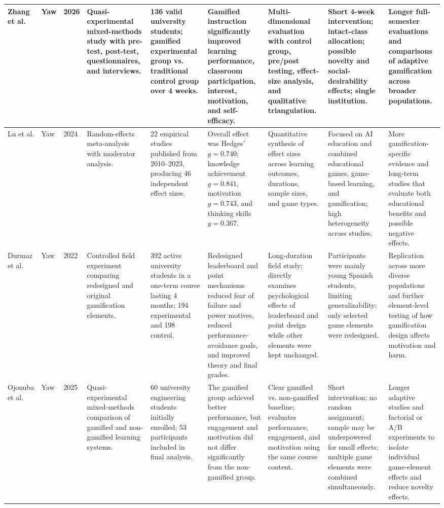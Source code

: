 \documentclass[12pt,a4paper]{article}
\begin{document}
\begin{longtable}{|
L{1.5cm}|
L{1.1cm}|
C{0.7cm}|
L{1.7cm}|
L{1.7cm}|
L{2.2cm}|
L{1.7cm}|
L{1.7cm}|
L{1.9cm}|}
Zhang et al. &
Yaw &
2026 &
Quasi-experimental mixed-methods study with pre-test, post-test, questionnaires, and interviews. &
136 valid university students; gamified experimental group vs. traditional control group over 4 weeks. &
Gamified instruction significantly improved learning performance, classroom participation, interest, motivation, and self-efficacy. &
Multi-dimensional evaluation with control group, pre/post testing, effect-size analysis, and qualitative triangulation. &
Short 4-week intervention; intact-class allocation; possible novelty and social-desirability effects; single institution. &
Longer full-semester evaluations and comparisons of adaptive gamification across broader populations.
\tabularnewline
\hline


Lu et al. &
Yaw &
2024 &
Random-effects meta-analysis with moderator analysis. &
22 empirical studies published from 2010--2023, producing 46 independent effect sizes. &
Overall effect was Hedges' $g=0.740$; knowledge achievement $g=0.841$, motivation $g=0.743$, and thinking skills $g=0.367$. &
Quantitative synthesis of effect sizes across learning outcomes, durations, sample sizes, and game types. &
Focused on AI education and combined educational games, game-based learning, and gamification; high heterogeneity across studies. &
More gamification-specific evidence and long-term studies that evaluate both educational benefits and possible negative effects.
\tabularnewline
\hline


Durmaz et al. &
Yaw &
2022 &
Controlled field experiment comparing redesigned and original gamification elements. &
392 active university students in a one-term course lasting 4 months; 194 experimental and 198 control. &
Redesigned leaderboard and point mechanisms reduced fear of failure and power motives, reduced performance-avoidance goals, and improved theory and final grades. &
Long-duration field study; directly examines psychological effects of leaderboard and point design while other elements were kept unchanged. &
Participants were mainly young Spanish students, limiting generalizability; only selected game elements were redesigned. &
Replication across more diverse populations and further element-level testing of how gamification design affects motivation and harm.
\tabularnewline
\hline


Ojonuba et al. &
Yaw &
2025 &
Quasi-experimental mixed-methods comparison of gamified and non-gamified learning systems. &
60 university engineering students initially enrolled; 53 participants included in final analysis. &
The gamified group achieved better performance, but engagement and motivation did not differ significantly from the non-gamified group. &
Clear gamified vs. non-gamified baseline; evaluates performance, engagement, and motivation using the same course content. &
Short intervention; no random assignment; sample may be underpowered for small effects; multiple game elements were combined simultaneously. &
Longer adaptive studies and factorial or A/B experiments to isolate individual game-element effects and reduce novelty effects.
\tabularnewline
\hline



\end{longtable}
\end{document}

